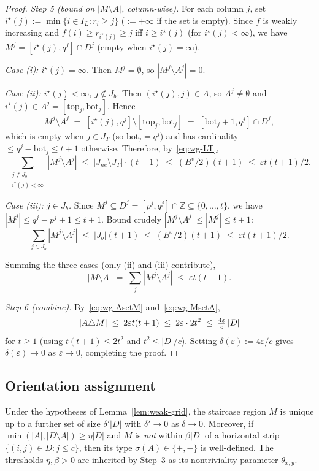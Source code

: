 \begin{proof}
\medskip\noindent\emph{Step 5 (bound on $|M\setminus A|$, column-wise).}
For each column $j$, set
\(
i^\star(j):=\min\{i\in I_L:r_i\ge j\}
\)
($:=+\infty$ if the set is empty). Since $f$ is weakly increasing and $f(i)\ge r_{i^\star(j)}\ge j$
iff $i\ge i^\star(j)$ (for $i^\star(j)<\infty$), we have
$M^j=[i^\star(j),q^j]\cap D^j$ (empty when $i^\star(j)=\infty$).

\emph{Case (i): $i^\star(j)=\infty$.} Then $M^j=\emptyset$, so $|M^j\setminus A^j|=0$.

\emph{Case (ii): $i^\star(j)<\infty$, $j\notin J_b$.} Then $(i^\star(j),j)\in A$, so
$A^j\ne\emptyset$ and $i^\star(j)\in A^j=[\mathrm{top}_j,\mathrm{bot}_j]$. Hence
\[
M^j\setminus A^j
\;=\;[i^\star(j),q^j]\setminus[\mathrm{top}_j,\mathrm{bot}_j]
\;=\;[\mathrm{bot}_j+1,q^j]\cap D^j,
\]
which is empty when $j\in J_T$ (so $\mathrm{bot}_j=q^j$) and has cardinality
$\le q^j-\mathrm{bot}_j\le t+1$ otherwise. Therefore, by~\eqref{eq:wg-LT},
\[
\sum_{\substack{j\notin J_b\\ i^\star(j)<\infty}}|M^j\setminus A^j|
\;\le\;|J_{ne}\setminus J_T|\cdot(t+1)
\;\le\;(B^v/2)(t+1)
\;\le\;\varepsilon t(t+1)/2.
\]

\emph{Case (iii): $j\in J_b$.} Since $M^j\subseteq D^j=[p^j,q^j]\cap\mathbb Z\subseteq\{0,\dots,t\}$, we have $|M^j|\le q^j-p^j+1\le t+1$. Bound crudely $|M^j\setminus A^j|\le|M^j|\le t+1$:
\[
\sum_{j\in J_b}|M^j\setminus A^j|
\;\le\;|J_b|(t+1)\;\le\;(B^v/2)(t+1)\;\le\;\varepsilon t(t+1)/2.
\]

Summing the three cases (only (ii) and (iii) contribute),
\begin{equation}\label{eq:wg-MsetA}
|M\setminus A|\;=\;\sum_j|M^j\setminus A^j|\;\le\;\varepsilon t(t+1).
\end{equation}

\medskip\noindent\emph{Step 6 (combine).}
By~\eqref{eq:wg-AsetM} and~\eqref{eq:wg-MsetA},
\[
|A\triangle M|\;\le\;2\varepsilon t(t+1)\;\le\;2\varepsilon\cdot 2t^2
\;\le\;\tfrac{4\varepsilon}{c}\,|D|
\]
for $t\ge 1$ (using $t(t+1)\le 2t^2$ and $t^2\le|D|/c$). Setting
$\delta(\varepsilon):=4\varepsilon/c$ gives $\delta(\varepsilon)\to 0$ as
$\varepsilon\to 0$, completing the proof.
\end{proof}

\subsection{Orientation assignment}

\begin{corollary}\label{cor:sign}
Under the hypotheses of Lemma~\ref{lem:weak-grid}, the staircase region $M$ is unique
up to a further set of size $\delta'|D|$ with $\delta'\to 0$ as $\delta\to 0$. Moreover,
if $\min(|A|,|D\setminus A|)\ge\eta|D|$ and $M$ is \emph{not} within $\beta|D|$ of a
horizontal strip $\{(i,j)\in D:j\le c\}$, then its type $\sigma(A)\in\{+,-\}$ is
well-defined. The thresholds $\eta,\beta>0$ are inherited by Step~3 as its
nontriviality parameter $\theta_{x,y}$.
\end{corollary}

